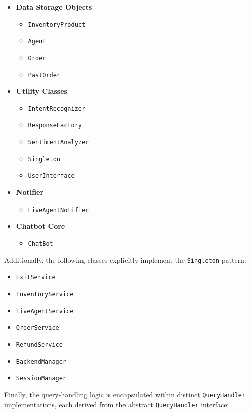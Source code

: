 \documentclass[11pt]{article}
\begin{document}
\begin{itemize}
	\item \textbf{Data Storage Objects}
		\begin{itemize}
			\item \texttt{InventoryProduct}
			\item \texttt{Agent}
			\item \texttt{Order}
			\item \texttt{PastOrder}
		\end{itemize}

	\item \textbf{Utility Classes}
		\begin{itemize}
			\item \texttt{IntentRecognizer}
			\item \texttt{ResponseFactory}
			\item \texttt{SentimentAnalyzer}
			\item \texttt{Singleton}
			\item \texttt{UserInterface}
		\end{itemize}

	\item \textbf{Notifier}
		\begin{itemize}
			\item \texttt{LiveAgentNotifier}
		\end{itemize}

	\item \textbf{Chatbot Core}
		\begin{itemize}
			\item \texttt{ChatBot}
		\end{itemize}
\end{itemize}
\noindent
Additionally, the following classes explicitly implement the \texttt{Singleton} pattern:
\begin{itemize}
	\item \texttt{ExitService}
	\item \texttt{InventoryService}
	\item \texttt{LiveAgentService}
	\item \texttt{OrderService}
	\item \texttt{RefundService}
	\item \texttt{BackendManager}
	\item \texttt{SessionManager}
\end{itemize}
\noindent
Finally, the query-handling logic is encapsulated within distinct \texttt{QueryHandler} implementations, each derived from the abstract \texttt{QueryHandler} interface:
\end{document}
